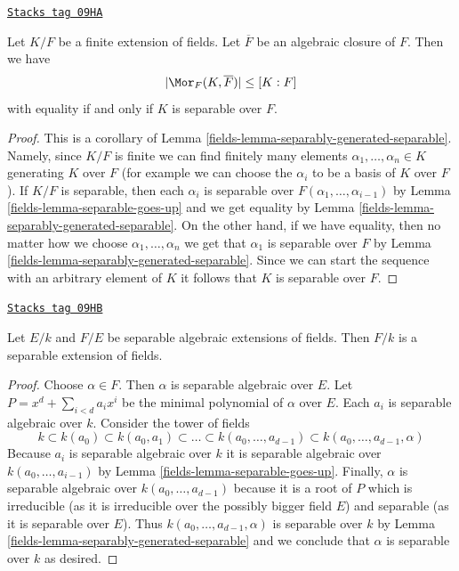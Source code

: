 \begin{lemma}
\label{fields-lemma-separable-equality}
\href{https://stacks.math.columbia.edu/tag/09HA}{\texttt{Stacks tag 09HA}}

Let $K/F$ be a finite extension of fields. Let $\overline{F}$ be an
algebraic closure of $F$. Then we have
$$
|\Mor_F(K, \overline{F})| \leq [K : F]
$$
with equality if and only if $K$ is separable over $F$.
\end{lemma}

\begin{proof}

This is a corollary of Lemma \ref{fields-lemma-separably-generated-separable}.
Namely, since $K/F$ is finite we can find finitely many elements
$\alpha_1, \ldots, \alpha_n \in K$ generating $K$ over $F$ (for example
we can choose the $\alpha_i$ to be a basis of $K$ over $F$).
If $K/F$ is separable, then each $\alpha_i$ is separable over
$F(\alpha_1, \ldots, \alpha_{i - 1})$ by Lemma \ref{fields-lemma-separable-goes-up}
and we get equality by Lemma \ref{fields-lemma-separably-generated-separable}.
On the other hand, if we have equality, then no matter how we choose
$\alpha_1, \ldots, \alpha_n$ we get that $\alpha_1$ is separable over
$F$ by Lemma \ref{fields-lemma-separably-generated-separable}. Since we
can start the sequence with an arbitrary element of $K$ it follows
that $K$ is separable over $F$.
\end{proof}

\begin{lemma}
\label{fields-lemma-separable-permanence}
\href{https://stacks.math.columbia.edu/tag/09HB}{\texttt{Stacks tag 09HB}}

Let $E/k$ and $F/E$ be separable algebraic extensions of fields. Then $F/k$
is a separable extension of fields.
\end{lemma}

\begin{proof}

Choose $\alpha \in F$. Then $\alpha$ is separable algebraic over $E$.
Let $P = x^d + \sum_{i < d} a_i x^i$ be the minimal polynomial of
$\alpha$ over $E$. Each $a_i$ is separable algebraic over $k$.
Consider the tower of fields
$$
k \subset k(a_0) \subset k(a_0, a_1) \subset \ldots \subset
k(a_0, \ldots, a_{d - 1}) \subset k(a_0, \ldots, a_{d - 1}, \alpha)
$$
Because $a_i$ is separable algebraic over $k$ it is separable algebraic
over $k(a_0, \ldots, a_{i - 1})$ by Lemma \ref{fields-lemma-separable-goes-up}.
Finally, $\alpha$ is separable algebraic over $k(a_0, \ldots, a_{d - 1})$
because it is a root of $P$ which is irreducible
(as it is irreducible over the possibly bigger field $E$)
and separable (as it is separable over $E$).
Thus $k(a_0, \ldots, a_{d - 1}, \alpha)$ is separable over $k$
by Lemma \ref{fields-lemma-separably-generated-separable}
and we conclude that $\alpha$ is separable over $k$ as desired.
\end{proof}

